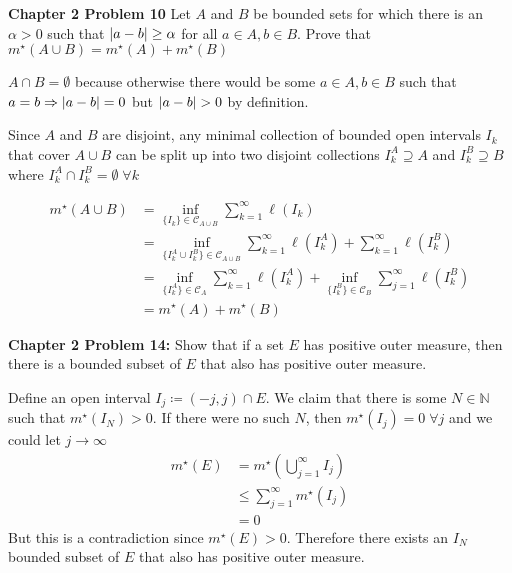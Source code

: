 \documentclass[11pt]{article}
\DeclarePairedDelimiter{\card}{\lvert}{\rvert}
\newcommand{\mstar}[1]{m^{\star}\left(#1\right)}
\newcommand{\isum}[1]{\sum_{#1=1}^{\infty}}
\begin{document}
    \clearpage
    \begin{mybox}
        \textbf{Chapter 2 Problem 10}
        Let $A$ and $B$ be bounded sets for which there is an $\alpha > 0$ such that $\card{a-b} \geq \alpha$ for all $a \in A, b \in B$.
        Prove that $\mstar{A \cup B} = \mstar{A} + \mstar{B}$
    \end{mybox}

    $A \cap B = \emptyset$ because otherwise there would be some $a \in A, b \in B$ such that $a = b \Rightarrow \card{a-b} = 0$ but $\card{a-b} > 0$ by definition.

    Since $A$ and $B$ are disjoint, any minimal collection of bounded open intervals $I_k$ that cover $A \cup B$ can be split up into two disjoint collections $I_k^{A} \supseteq A$ and $I_k ^{B} \supseteq B$ where $I_k^{A} \cap I_k ^{B} = \emptyset \; \forall k$

    \begin{align*}
        \mstar{A \cup B} &= \inf_{\{I_k\} \in \mathcal{C}_{A \cup B}} \sum_{k=1}^{\infty} \ell (I_k) \\
        &= \inf_{\{I_k^{A} \cup I_k^{B}\} \in \mathcal{C}_{A \cup B}} \sum_{k=1}^{\infty} \ell (I_k^{A}) + \sum_{k=1}^{\infty} \ell (I_k^{B})  \\
        &= \inf_{\{I_k^{A}\} \in \mathcal{C}_A} \sum_{k=1}^{\infty} \ell (I_k^{A}) + \inf_{\{I_k^{B}\} \in \mathcal{C}_B} \sum_{j=1}^{\infty} \ell (I_k^{B})  \\
        &= \mstar{A} + \mstar{B}
    \end{align*}

    \clearpage
    \begin{mybox}
        \textbf{Chapter 2 Problem 14:}
        Show that if a set $E$ has positive outer measure, then there is a bounded subset of $E$ that also has positive outer measure.
    \end{mybox}

    Define an open interval $I_j \coloneqq (-j, j) \cap E$.
    We claim that there is some $N \in \mathbb{N}$ such that $\mstar{I_N} > 0$.
    If there were no such $N$, then $\mstar{I_j} = 0 \; \forall j$ and we could let $j \rightarrow \infty$
    \begin{align*}
        \mstar{E} &= \mstar{\bigcup_{j=1}^{\infty} I_j}\\
        &\leq \isum{j} \mstar{I_j} \tag{Countable Subadditivity} \\
        &= 0
    \end{align*}
    But this is a contradiction since $\mstar{E} > 0$.
    Therefore there exists an $I_N$ bounded subset of $E$ that also has positive outer measure.
\end{document}
